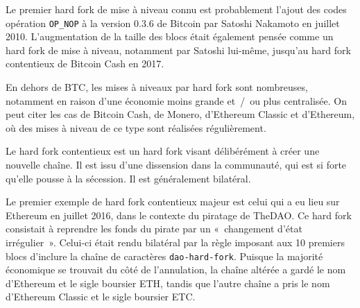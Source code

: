 Le premier hard fork de mise à niveau connu est probablement l'ajout des codes opération \texttt{OP\_NOP} à la version 0.3.6 de Bitcoin par Satoshi Nakamoto en juillet 2010. L'augmentation de la taille des blocs était également pensée comme un hard fork de mise à niveau, notamment par Satoshi lui-même, jusqu'au hard fork contentieux de Bitcoin Cash en 2017.

En dehors de BTC, les mises à niveaux par hard fork sont nombreuses, notamment en raison d'une économie moins grande et~/~ou plus centralisée. On peut citer les cas de Bitcoin Cash, de Monero, d'Ethereum Classic et d'Ethereum, où des mises à niveau de ce type sont réalisées régulièrement.

Le hard fork contentieux est un hard fork visant délibérément à créer une nouvelle chaîne. Il est issu d'une dissension dans la communauté, qui est si forte qu'elle pousse à la sécession. Il est généralement bilatéral.

Le premier exemple de hard fork contentieux majeur est celui qui a eu lieu sur Ethereum en juillet 2016, dans le contexte du piratage de TheDAO. Ce hard fork consistait à reprendre les fonds du pirate par un «~changement d'état irrégulier~». Celui-ci était rendu bilatéral par la règle imposant aux 10 premiers blocs d'inclure la chaîne de caractères \texttt{dao-hard-fork}. Puisque la majorité économique se trouvait du côté de l'annulation, la chaîne altérée a gardé le nom d'Ethereum et le sigle boursier ETH, tandis que l'autre chaîne a pris le nom d'Ethereum Classic et le sigle boursier ETC.

